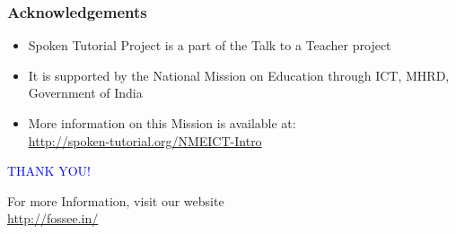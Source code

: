 \documentclass[17pt]{beamer}
\begin{document}
\begin{frame}
\frametitle{Acknowledgements}
\begin{itemize}
\item Spoken Tutorial Project is a part of the Talk to a Teacher  project 
\item It is supported by the National Mission on Education through  ICT, MHRD, Government of India 
\item More information on this Mission is available at: \\{\color{blue}\url{http://spoken-tutorial.org/NMEICT-Intro}}
\end{itemize}
\end{frame}
\begin{frame}
  \begin{block}{}
  \begin{center}
  \textcolor{blue}{\Large THANK YOU!} 
  \end{center}
  \end{block}
\begin{block}{}
  \begin{center}
    For more Information, visit our website\\
    \url{http://fossee.in/}
  \end{center}  
  \end{block}
\end{frame}
\end{document}
